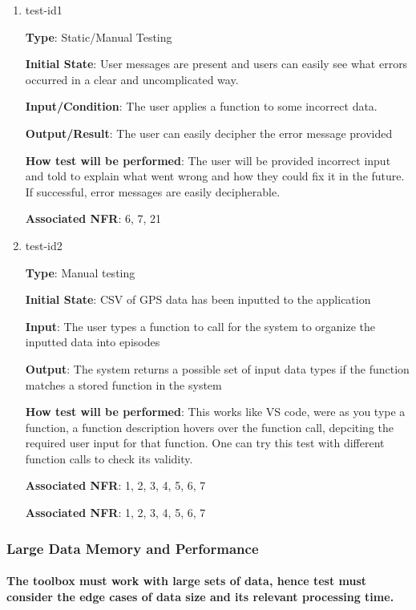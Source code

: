 \documentclass[12pt, titlepage]{article}
\begin{document}
\begin{enumerate}

\item{test-id1\\}

\textbf{Type}: Static/Manual Testing
					
\textbf{Initial State}: User messages are present and users can easily see what errors occurred in a clear and uncomplicated way.
					
\textbf{Input/Condition}: The user applies a function to some incorrect data.
					
\textbf{Output/Result}: The user can easily decipher the error message provided
					
\textbf{How test will be performed}: The user will be provided incorrect input and told to explain what went wrong and how they could fix it in the future. If successful, error messages are easily decipherable. 

\textbf{Associated NFR}: 6, 7, 21
\item{test-id2\\}

\textbf{Type}: Manual testing
					
\textbf{Initial State}: CSV of GPS data has been inputted to the application
					
\textbf{Input}: The user types a function to call for the system to organize the
inputted data into episodes
					
\textbf{Output}: The system returns a possible set of input data types if the function matches a stored function in the system
					
\textbf{How test will be performed}: This works like VS code, were as you type a function, a function description hovers over the function call, depciting the required user input for that function. One can try this test with different function calls to check its validity.

\textbf{Associated NFR}: 1, 2, 3, 4, 5, 6, 7 




\textbf{Associated NFR}: 1, 2, 3, 4, 5, 6, 7 

\end{enumerate}

\subsubsection{Large Data Memory and Performance}
\paragraph{The toolbox must work with large sets of data, hence test must consider the edge cases of data size and its relevant processing time. }
\end{document}
